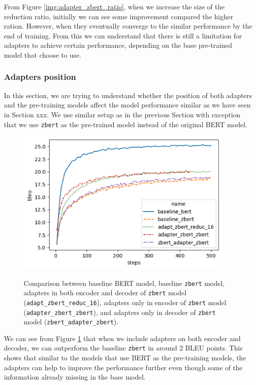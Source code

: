 From Figure \ref{img:adapter_zbert_ratio}, when we increase the size of the reduction ratio, initially we can see some improvement compared the higher ration. However, when they eventually converge to the similar performance by the end of training. From this we can understand that there is still a limitation for adapters to achieve certain performance, depending on the base pre-trained model that choose to use.

\subsubsection{Adapters position}
In this section, we are trying to understand whether the position of both adapters and the pre-training models affect the model performance similar as we have seen in Section xxx. We use similar setup as in the previous Section with exception that we use \texttt{zbert} as the pre-trained model instead of the original BERT model.

\begin{figure}[h]
    {\includegraphics[width=0.95\textwidth]{img/zbert_pos.png}}
    \centering
    \caption{Comparison between baseline BERT model, baseline \texttt{zbert} model, adapters in both encoder and decoder of \texttt{zbert} model (\texttt{adapt\_zbert\_reduc\_16}), adapters only in encoder of \texttt{zbert} model (\texttt{adapter\_zbert\_zbert}), and adapters only in decoder of \texttt{zbert} model (\texttt{zbert\_adapter\_zbert}).}
    \label{img:zbert_pos}
\end{figure}

We can see from Figure \ref{img:zbert_pos} that when we include adapters on both encoder and decoder, we can outperform the baseline \texttt{zbert} in around 2 BLEU points. This shows that similar to the models that use BERT as the pre-training models, the adapters can help to improve the performance further even though some of the information already missing in the base model.

